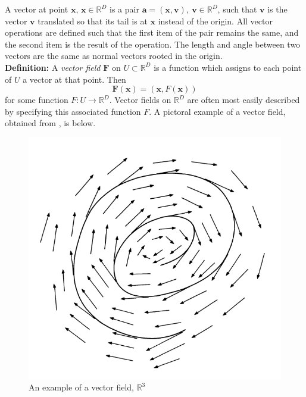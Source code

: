 \documentclass[12pt]{report}
\begin{document}
A vector at point $\mathbf{x}$, $\mathbf{x} \in \mathbb{R}^{D}$ is a pair 
$\mathbf{a} = (\mathbf{x}, \mathbf{v}), \ \mathbf{v} \in \mathbb{R}^{D}$, 
such that $\mathbf{v}$ is the vector $\mathbf{v}$ translated 
so that its tail is at $\mathbf{x}$ instead of the origin. 
All vector operations are defined such that the first item of 
the pair remains the same, and the second item is the result of the operation. 
The length and angle between two vectors are the same 
as normal vectors rooted in the origin.\\
\textbf{Definition:} A \textit{vector field} $\mathbf{F}$ on 
$U \subset \mathbb{R}^{D}$ is a function which assigns to each point
of $U$ a vector at that point. Then
$$\mathbf{F}(\mathbf{x}) = (\mathbf{x}, F(\mathbf{x}))$$ for some function 
$F: U \longrightarrow \mathbb{R}^{D}$. Vector fields on 
$\mathbb{R}^{D}$ are often most easily described by 
specifying this associated function $F$.
A pictoral example of a vector field, obtained from 
\cite{ancient}, is below.
\begin{figure}[ht]
    \begin{center}
        \includegraphics[scale=0.4]{fig2.5.PNG}
        \caption{An example of a vector field, $\mathbb{R}^3$}
        \label{fig:vectorfield}
    \end{center}
\end{figure}
\end{document}

